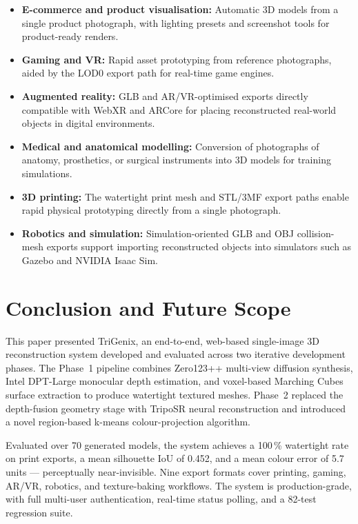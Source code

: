 ﻿\documentclass[conference]{IEEEtran}
\begin{document}
\begin{itemize}
  \item \textbf{E-commerce and product visualisation:} Automatic 3D models from a single product photograph,
        with lighting presets and screenshot tools for product-ready renders.
  \item \textbf{Gaming and VR:} Rapid asset prototyping from reference photographs, aided by the LOD0
        export path for real-time game engines.
  \item \textbf{Augmented reality:} GLB and AR/VR-optimised exports directly compatible with WebXR and
        ARCore for placing reconstructed real-world objects in digital environments.
  \item \textbf{Medical and anatomical modelling:} Conversion of photographs of anatomy, prosthetics,
        or surgical instruments into 3D models for training simulations.
  \item \textbf{3D printing:} The watertight print mesh and STL/3MF export paths enable rapid physical
        prototyping directly from a single photograph.
  \item \textbf{Robotics and simulation:} Simulation-oriented GLB and OBJ collision-mesh exports support
        importing reconstructed objects into simulators such as Gazebo and NVIDIA Isaac Sim.
\end{itemize}

\section{Conclusion and Future Scope}

This paper presented TriGenix, an end-to-end, web-based single-image 3D reconstruction system developed and
evaluated across two iterative development phases. The Phase~1 pipeline combines Zero123++ multi-view diffusion
synthesis, Intel DPT-Large monocular depth estimation, and voxel-based Marching Cubes surface extraction to
produce watertight textured meshes. Phase~2 replaced the depth-fusion geometry stage with TripoSR neural
reconstruction and introduced a novel region-based k-means colour-projection algorithm.

Evaluated over 70 generated models, the system achieves a 100\,\% watertight rate on print exports, a mean
silhouette IoU of 0.452, and a mean colour error of 5.7 units — perceptually near-invisible. Nine export
formats cover printing, gaming, AR/VR, robotics, and texture-baking workflows. The system is production-grade,
with full multi-user authentication, real-time status polling, and a 82-test regression suite.
\end{document}
